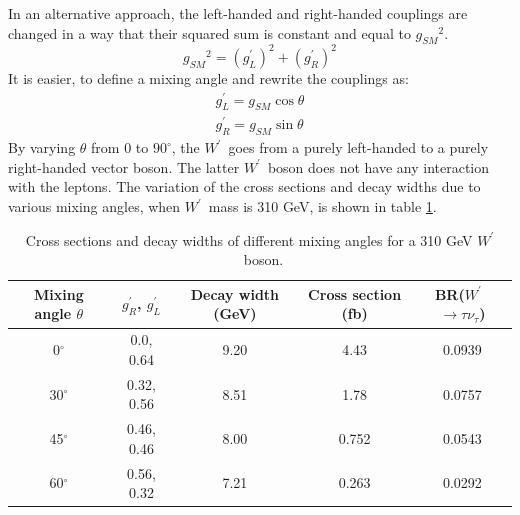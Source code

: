 \documentclass[preprint,showpacs,preprintnumbers]{revtex4}
\newcommand{\wprime}{\ensuremath{W^\prime}~}
\newcommand{\gR}{\ensuremath{g^\prime_R}}
\newcommand{\gL}{\ensuremath{g^\prime_L}}
\newcommand{\gSM}{\ensuremath{g_{\scriptscriptstyle SM}}}
\begin{document}
In an alternative approach, the left-handed and right-handed couplings are changed in a way that their squared sum is constant and equal to $\gSM^2$.
\begin{equation}
\gSM^2 = (\gL)^2 +  (\gR)^2 
\end{equation}
It is easier, to define a mixing angle and rewrite the couplings as:
\begin{eqnarray}
\gL  = \gSM \cos\theta \\
\gR  = \gSM \sin\theta
\end{eqnarray}
By varying $\theta$ from 0 to $ 90^\circ $, the \wprime goes from a purely left-handed to a purely right-handed vector boson. The latter \wprime boson does not have any interaction with the leptons. 
The variation of the cross sections and decay widths due to various mixing angles, when \wprime mass is 310 GeV, is shown in table \ref{tab:mixingAngle}.
\begin{table}[htb]
	\centering
	\caption{Cross sections and decay widths of different mixing angles for a 310 GeV \wprime boson. \label{tab:mixingAngle} }
	\begin{tabular}{|c|c|c|c|c|}
	\hline 
	Mixing angle $\theta$  & \gR,  \gL & Decay width (GeV)  &  Cross section (fb) & BR(\wprime $\rightarrow \tau \nu_\tau$) \\
	\hline 
	0$^\circ$  & 0.0, 0.64  & 9.20  & 4.43 & 0.0939 \\
	30$^\circ$ & 0.32, 0.56 & 8.51  & 1.78 & 0.0757\\
	45$^\circ$ & 0.46, 0.46 & 8.00  & 0.752 & 0.0543\\
	60$^\circ$ & 0.56, 0.32 & 7.21  & 0.263 & 0.0292\\
	\hline
\end{tabular}
\end{table}
\end{document}
